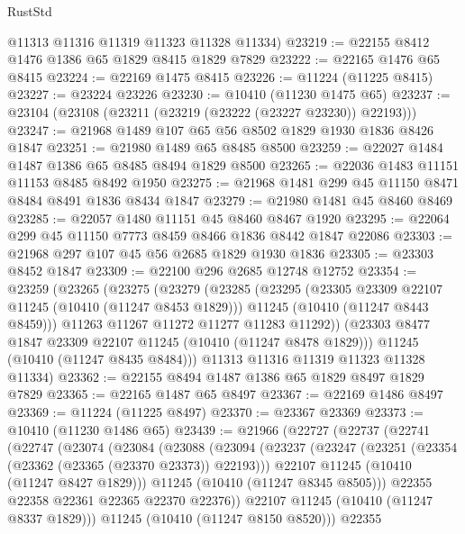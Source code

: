 \begin{lexlean}{RustStd}
\begin{coremodule}
      @11313
      @11316
      @11319
      @11323
      @11328
      @11334)
@23219 := @22155 @8412 @1476 @1386 @65 @1829 @8415 @1829 @7829
@23222 := @22165 @1476 @65 @8415
@23224 := @22169 @1475 @8415
@23226 := @11224 (@11225 @8415)
@23227 := @23224 @23226
@23230 := @10410 (@11230 @1475 @65)
@23237 := @23104 (@23108 (@23211 (@23219 (@23222 (@23227 @23230)) @22193)))
@23247 := @21968 @1489 @107 @65 @56 @8502 @1829 @1930 @1836 @8426 @1847
@23251 := @21980 @1489 @65 @8485 @8500
@23259 := @22027 @1484 @1487 @1386 @65 @8485 @8494 @1829 @8500
@23265 := @22036 @1483 @11151 @11153 @8485 @8492 @1950
@23275 := @21968 @1481 @299 @45 @11150 @8471 @8484 @8491 @1836 @8434 @1847
@23279 := @21980 @1481 @45 @8460 @8469
@23285 := @22057 @1480 @11151 @45 @8460 @8467 @1920
@23295 := @22064 @299 @45 @11150 @7773 @8459 @8466 @1836 @8442 @1847 @22086
@23303 := @21968 @297 @107 @45 @56 @2685 @1829 @1930 @1836
@23305 := @23303 @8452 @1847
@23309 := @22100 @296 @2685 @12748 @12752
@23354 := @23259
    (@23265
      (@23275
        (@23279
          (@23285
            (@23295
              (@23305 @23309 @22107 @11245 (@10410 (@11247 @8453 @1829)))
              @11245
              (@10410 (@11247 @8443 @8459)))
            @11263
            @11267
            @11272
            @11277
            @11283
            @11292))
        (@23303 @8477 @1847 @23309 @22107 @11245 (@10410 (@11247 @8478 @1829)))
        @11245
        (@10410 (@11247 @8435 @8484)))
      @11313
      @11316
      @11319
      @11323
      @11328
      @11334)
@23362 := @22155 @8494 @1487 @1386 @65 @1829 @8497 @1829 @7829
@23365 := @22165 @1487 @65 @8497
@23367 := @22169 @1486 @8497
@23369 := @11224 (@11225 @8497)
@23370 := @23367 @23369
@23373 := @10410 (@11230 @1486 @65)
@23439 := @21966
    (@22727
      (@22737
        (@22741
          (@22747
            (@23074
              (@23084
                (@23088
                  (@23094
                    (@23237
                      (@23247
                        (@23251 (@23354 (@23362 (@23365 (@23370 @23373)) @22193)))
                        @22107
                        @11245
                        (@10410 (@11247 @8427 @1829)))
                      @11245
                      (@10410 (@11247 @8345 @8505)))
                    @22355
                    @22358
                    @22361
                    @22365
                    @22370
                    @22376))
                @22107
                @11245
                (@10410 (@11247 @8337 @1829)))
              @11245
              (@10410 (@11247 @8150 @8520)))
            @22355

\end{coremodule}
\end{lexlean}
